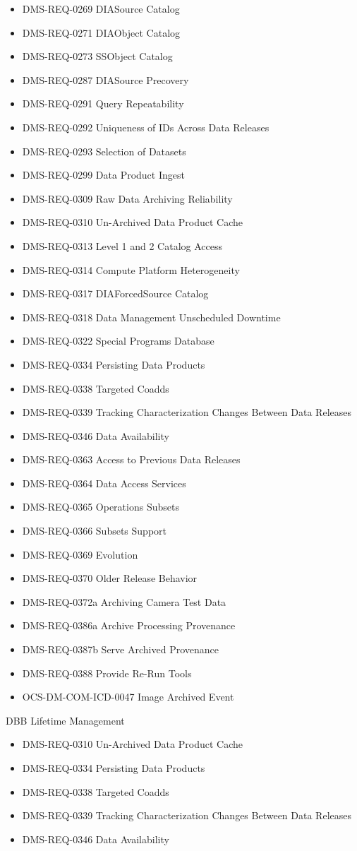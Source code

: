 \begin{itemize}
\item DMS-REQ-0269 DIASource Catalog
\item DMS-REQ-0271 DIAObject Catalog
\item DMS-REQ-0273 SSObject Catalog
\item DMS-REQ-0287 DIASource Precovery
\item DMS-REQ-0291 Query Repeatability
\item DMS-REQ-0292 Uniqueness of IDs Across Data Releases
\item DMS-REQ-0293 Selection of Datasets
\item DMS-REQ-0299 Data Product Ingest
\item DMS-REQ-0309 Raw Data Archiving Reliability
\item DMS-REQ-0310 Un-Archived Data Product Cache
\item DMS-REQ-0313 Level 1 and 2 Catalog Access
\item DMS-REQ-0314 Compute Platform Heterogeneity
\item DMS-REQ-0317 DIAForcedSource Catalog
\item DMS-REQ-0318 Data Management Unscheduled Downtime
\item DMS-REQ-0322 Special Programs Database
\item DMS-REQ-0334 Persisting Data Products
\item DMS-REQ-0338 Targeted Coadds
\item DMS-REQ-0339 Tracking Characterization Changes Between Data Releases
\item DMS-REQ-0346 Data Availability
\item DMS-REQ-0363 Access to Previous Data Releases
\item DMS-REQ-0364 Data Access Services
\item DMS-REQ-0365 Operations Subsets
\item DMS-REQ-0366 Subsets Support
\item DMS-REQ-0369 Evolution
\item DMS-REQ-0370 Older Release Behavior
\item DMS-REQ-0372a Archiving Camera Test Data
\item DMS-REQ-0386a Archive Processing Provenance
\item DMS-REQ-0387b Serve Archived Provenance
\item DMS-REQ-0388 Provide Re-Run Tools
\item OCS-DM-COM-ICD-0047 Image Archived Event
\end{itemize}
DBB Lifetime Management \begin{itemize}
\item DMS-REQ-0310 Un-Archived Data Product Cache
\item DMS-REQ-0334 Persisting Data Products
\item DMS-REQ-0338 Targeted Coadds
\item DMS-REQ-0339 Tracking Characterization Changes Between Data Releases
\item DMS-REQ-0346 Data Availability
\end{itemize}
